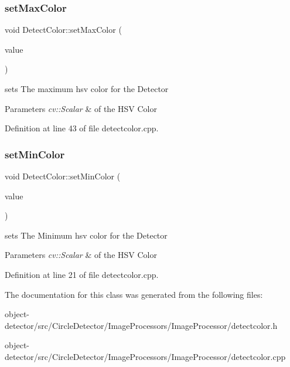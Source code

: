 \subsubsection{\texorpdfstring{set\+Max\+Color}{setMaxColor}}
{\footnotesize\ttfamily void Detect\+Color\+::set\+Max\+Color (\begin{DoxyParamCaption}\item[{const cv\+::\+Scalar \&}]{value }\end{DoxyParamCaption})\hspace{0.3cm}{\ttfamily [slot]}}



sets The maximum hsv color for the Detector 


\begin{DoxyParams}{Parameters}
{\em cv\+::\+Scalar} & of the H\+SV Color \\
\hline
\end{DoxyParams}


Definition at line 43 of file detectcolor.\+cpp.

\mbox{\label{class_image_processor_1_1_detect_color_af9f1efdf1535b8a8516c3feb536fc8b8}} 
\subsubsection{\texorpdfstring{set\+Min\+Color}{setMinColor}}
{\footnotesize\ttfamily void Detect\+Color\+::set\+Min\+Color (\begin{DoxyParamCaption}\item[{const cv\+::\+Scalar \&}]{value }\end{DoxyParamCaption})\hspace{0.3cm}{\ttfamily [slot]}}



sets The Minimum hsv color for the Detector 


\begin{DoxyParams}{Parameters}
{\em cv\+::\+Scalar} & of the H\+SV Color \\
\hline
\end{DoxyParams}


Definition at line 21 of file detectcolor.\+cpp.



The documentation for this class was generated from the following files\+:\begin{DoxyCompactItemize}
\item 
object-\/detector/src/\+Circle\+Detector/\+Image\+Processors/\+Image\+Processor/detectcolor.\+h\item 
object-\/detector/src/\+Circle\+Detector/\+Image\+Processors/\+Image\+Processor/detectcolor.\+cpp\end{DoxyCompactItemize}
